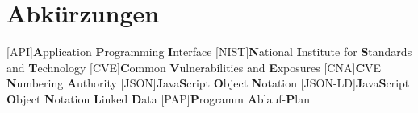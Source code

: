 \section{Abkürzungen} \label{sec:Abkürzungen}
    \begin{acronym}[LangesWortFuerDieEinstellung]
        [API]{\textbf{A}pplication \textbf{P}rogramming \textbf{I}nterface}
        [NIST]{\textbf{N}ational \textbf{I}nstitute for \textbf{S}tandards and \textbf{T}echnology}
        [CVE]{\textbf{C}ommon \textbf{V}ulnerabilities and \textbf{E}xposures}
        [CNA]{\textbf{C}VE \textbf{N}umbering \textbf{A}uthority}
        [JSON]{\textbf{J}ava\textbf{S}cript \textbf{O}bject \textbf{N}otation}
        [JSON-LD]{\textbf{J}ava\textbf{S}cript \textbf{O}bject \textbf{N}otation \textbf{L}inked \textbf{D}ata}
        [PAP]{\textbf{P}rogramm \textbf{A}blauf-\textbf{P}lan}
    \end{acronym}